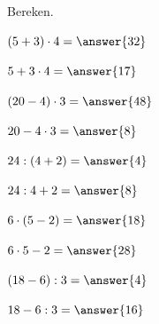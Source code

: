 \documentclass{ximera}
\begin{document}

\begin{oefening}{\oefB\ESS}

Bereken.

\begin{question} \((5+3)\cdot4=\answer{32}\) \end{question}

\begin{question} \(5+3\cdot4=\answer{17}\) \end{question}

\begin{question} \((20-4)\cdot3=\answer{48}\) \end{question}

\begin{question} \(20-4\cdot3=\answer{8}\) \end{question}

\begin{question} \(24:(4+2)=\answer{4}\) \end{question}

\begin{question} \(24:4+2=\answer{8}\) \end{question}

\begin{question} \(6\cdot(5-2)=\answer{18}\) \end{question}

\begin{question} \(6\cdot5-2=\answer{28}\) \end{question}

\begin{question} \((18-6):3=\answer{4}\) \end{question}

\begin{question} \(18-6:3=\answer{16}\) \end{question}

\end{oefening}


\end{document}
